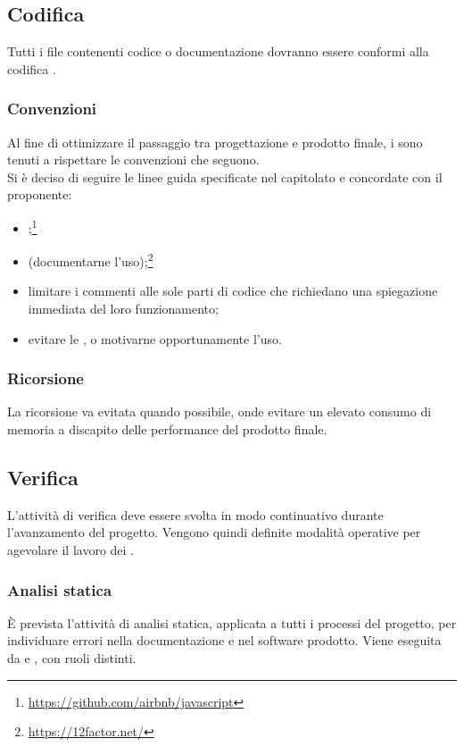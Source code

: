 \subsection{Codifica}
Tutti i file contenenti codice o documentazione dovranno essere conformi alla codifica .

\subsubsection{Convenzioni} \label{sec:convenzioni}
Al fine di ottimizzare il passaggio tra progettazione e prodotto finale, i \Programmatori{} sono tenuti a rispettare le convenzioni che seguono.\\
Si è deciso di seguire le linee guida specificate nel capitolato e concordate con il proponente:
\begin{itemize}
	\item {};\footnote{\url{https://github.com/airbnb/javascript}}
	\item {} (documentarne l'uso);\footnote{\url{https://12factor.net/}}
	\item limitare i commenti alle sole parti di codice che richiedano una spiegazione immediata del loro funzionamento;
	\item evitare le , o motivarne opportunamente l’uso.
\end{itemize}
\subsubsection{Ricorsione}
La ricorsione va evitata quando possibile, onde evitare un elevato consumo di memoria a discapito delle performance del prodotto finale. 

\subsection{Verifica}
L’attività di verifica deve essere svolta in modo continuativo durante l'avanzamento del progetto. Vengono quindi definite modalità operative per agevolare il lavoro dei \Verificatori.

\subsubsection{Analisi statica}
\`{E} prevista l'attività di analisi statica, applicata a tutti i processi del progetto, per individuare errori nella documentazione e nel software prodotto. Viene eseguita da \Verificatori{} e \Programmatori{}, con ruoli distinti.

